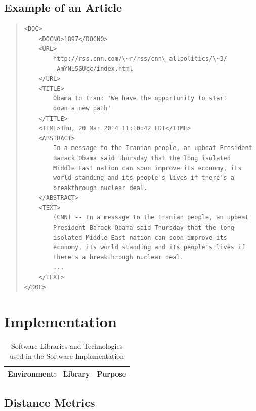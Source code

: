 \documentclass[11pt]{article}
\begin{document}
\pagebreak
\subsection{Example of an Article}

\small 
\begin{quote} \label{samplearticle}
\begin{verbatim}
<DOC>
    <DOCNO>1897</DOCNO>
    <URL>
        http://rss.cnn.com/\~r/rss/cnn\_allpolitics/\~3/
        -AmYNL5GUcc/index.html
    </URL>
    <TITLE>
        Obama to Iran: 'We have the opportunity to start
        down a new path'
    </TITLE>
    <TIME>Thu, 20 Mar 2014 11:10:42 EDT</TIME>
    <ABSTRACT>
        In a message to the Iranian people, an upbeat President
        Barack Obama said Thursday that the long isolated
        Middle East nation can soon improve its economy, its
        world standing and its people's lives if there's a
        breakthrough nuclear deal.
    </ABSTRACT>
    <TEXT>
        (CNN) -- In a message to the Iranian people, an upbeat
        President Barack Obama said Thursday that the long
        isolated Middle East nation can soon improve its
        economy, its world standing and its people's lives if
        there's a breakthrough nuclear deal.
        ...
    </TEXT>
</DOC>
\end{verbatim}
\end{quote}
\normalsize


\section{Implementation} \label{sec:software}

\begin{table}[h]
	\centering
	\begin{tabular}{ r c c  }
		\hline
		Environment: & Library & Purpose \\ \hline

	\end{tabular}
	
	\caption{Software Libraries and Technologies used in the Software Implementation}
	\label{table:categories}
\end{table}

\subsection{Distance Metrics}
\end{document}
